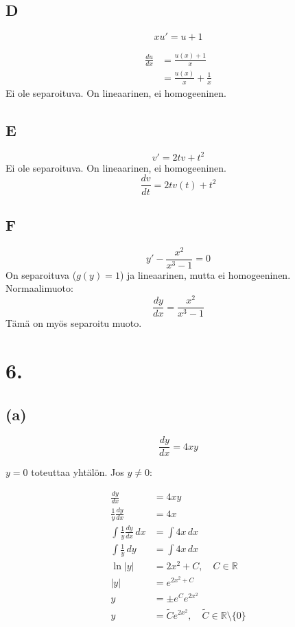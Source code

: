 \documentclass{article}
\begin{document}
\subsection*{D}
\[
  xu' = u + 1
\]

\begin{align*}
  \frac{du}{dx} &= \frac{u(x) + 1}{x} \\
                &= \frac{u(x)}{x} + \frac{1}{x}
\end{align*}
Ei ole separoituva. On lineaarinen, ei homogeeninen.

\subsection*{E}
\[
  v' = 2tv + t^2
\]
Ei ole separoituva. On lineaarinen, ei homogeeninen.
\[
  \frac{dv}{dt} = 2tv(t) + t^2
\]

\subsection*{F}
\[
  y' - \frac{x^2}{x^3 - 1} = 0
\]
On separoituva ($g(y) = 1$) ja lineaarinen, mutta ei homogeeninen.
Normaalimuoto:
\[
  \frac{dy}{dx} = \frac{x^2}{x^3 - 1}
\]
Tämä on myös separoitu muoto.

\section*{6.}

\subsection*{(a)}

\[
  \frac{dy}{dx} = 4xy
\]

$y = 0$ toteuttaa yhtälön. Jos $y \neq 0$:

\begin{align*}
  \frac{dy}{dx} &= 4xy \\
  \frac{1}{y} \frac{dy}{dx} &= 4x \\
  \int \frac{1}{y} \frac{dy}{dx} \, dx &= \int 4x \, dx \\
  \int \frac{1}{y} \, dy &= \int 4x \, dx \\
  \ln |y| &= 2x^2 + C, \quad C \in \mathbb{R} \\
  |y| &= e^{2x^2 + C} \\
  y &= \pm e^C e^{2x^2} \\
  y &= \tilde{C} e^{2x^2}, \quad \tilde{C} \in \mathbb{R} \setminus \{0\} \\
\end{align*}
\end{document}
